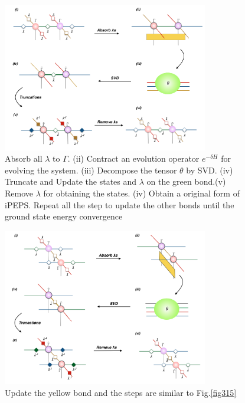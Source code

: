 \begin{figure}[ht]
	\centering
	\includegraphics[width=0.80\textwidth]{figures/fig315.png}
	\caption[The tensor network diagrams of updating the green bond in iPEPS with 2D-iTEBD]{Absorb all $\lambda$ to $\Gamma$. (ii) Contract an evolution operator $e^{-\delta H}$ for evolving the system. (iii) Decompose the tensor $\theta$ by SVD. (iv) Truncate and Update the states and $\lambda$ on the green bond.(v) Remove $\lambda$ for obtaining the states. (iv) Obtain a original form of iPEPS. Repeat all the step to update the other bonds until the ground state energy convergence}
	\label{fig316}
\end{figure}

	\begin{figure}[ht]
	\centering
	\includegraphics[width=0.80\textwidth]{figures/fig316.png}
	\caption[The tensor network diagrams of updating the yellow bond in iPEPS with 2D-iTEBD]{Update the yellow bond and the steps are similar to Fig.\ref{fig315}}
	\label{fig317}
	\end{figure}

